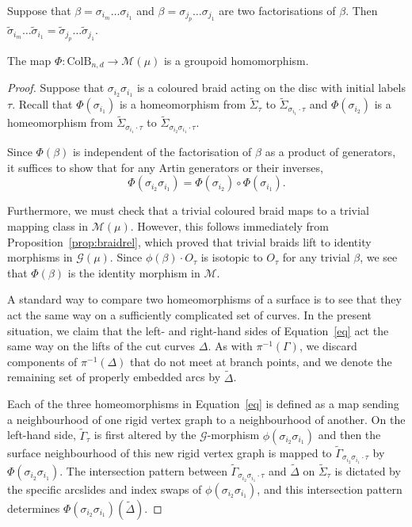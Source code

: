 \documentclass[10pt,a4paper]{amsart}
\def\ws{\widetilde{\Sigma}}
\begin{document}
\begin{proposition}\label{prop:braidrel} Suppose that $\beta=\sigma_{i_m}\dots\sigma_{i_1}$ and $\beta=\sigma_{j_p}\dots\sigma_{j_1}$ are two factorisations of $\beta$.  Then $\widetilde{\sigma}_{i_m}\dots \widetilde{\sigma}_{i_1}=\widetilde{\sigma}_{j_p}\dots \widetilde{\sigma}_{j_1}$.
\end{proposition}

\begin{theorem}\label{thm:homom2} The map $\Phi: \text{ColB}_{n,d}\rightarrow \mathcal{M}(\mu)$ is a groupoid homomorphism.
\end{theorem}

\begin{proof} 
Suppose that $\sigma_{i_2}\sigma_{i_1}$ is a coloured braid acting on the disc with initial labels $\tau$.  Recall that $\Phi(\sigma_{i_1})$ is a homeomorphism from $\ws_\tau$ to $\ws_{\sigma_{i_1}\cdot \tau}$ and $\Phi(\sigma_{i_2})$ is a homeomorphism from $\ws_{\sigma_{i_1}\cdot \tau}$ to $\ws_{\sigma_{i_2}\sigma_{i_1}\cdot \tau}$. 

Since $\Phi(\beta)$ is independent of the factorisation of $\beta$ as a product of generators, it suffices to show that for any Artin generators or their inverses, \begin{equation}\label{eq}\Phi(\sigma_{i_2}\sigma_{i_1})=\Phi(\sigma_{i_2})\circ\Phi(\sigma_{i_1}).\end{equation}
 
Furthermore, we must check that a trivial coloured braid maps to a trivial mapping class in $\mathcal{M}(\mu)$.  However, this follows immediately from Proposition~\ref{prop:braidrel}, which proved that trivial braids lift to identity morphisms in $\mathcal{G}(\mu)$.  Since $\phi(\beta) \cdot O_\tau$ is isotopic to $O_\tau$ for any trivial $\beta$, we see that $\Phi(\beta)$ is the identity morphism in $\mathcal{M}$.



A standard way to compare two homeomorphisms of a surface is to see that they act the same way on a sufficiently complicated set of curves.  In the present situation, we claim that the left- and right-hand sides of Equation~\ref{eq} act the same way on the lifts of the cut curves $\Delta$.  As with $\pi^{-1}(\Gamma)$, we discard components of $\pi^{-1}(\Delta)$ that do not meet at branch points, and we denote the remaining set of properly embedded arcs by $\widetilde{\Delta}$.  

Each of the three homeomorphisms in Equation~\ref{eq} is defined as a map sending a neighbourhood of one rigid vertex graph to a neighbourhood of another.  On the left-hand side, $\widetilde{\Gamma}_\tau$ is first altered by the $\mathcal{G}$-morphism $\phi(\sigma_{i_2}\sigma_{i_1})$ and then the surface neighbourhood of this new rigid vertex graph is mapped to $\widetilde{\Gamma}_{\sigma_{i_2}\sigma_{i_1}\cdot \tau}$ by $\Phi(\sigma_{i_2}\sigma_{i_1})$.  The intersection pattern between $\widetilde{\Gamma}_{\sigma_{i_2}\sigma_{i_1}\cdot \tau}$ and $\widetilde{\Delta}$ on $\ws_\tau$  is dictated by the specific arcslides and index swaps of $\phi(\sigma_{i_2}\sigma_{i_1})$, and this intersection pattern determines $\Phi(\sigma_{i_2}\sigma_{i_1})(\widetilde{\Delta})$.  


\end{proof}
\end{document}

